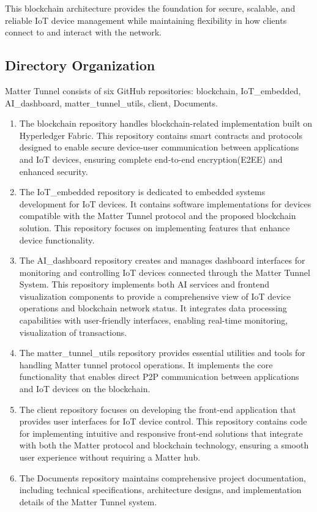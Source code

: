 \documentclass[conference]{IEEEtran}
\begin{document}
This blockchain architecture provides the foundation for secure, scalable, and reliable IoT device management while maintaining flexibility in how clients connect to and interact with the network.


\subsection{Directory Organization}

Matter Tunnel consists of six GitHub repositories: blockchain, IoT\_embedded, AI\_dashboard, matter\_tunnel\_utils, client, Documents.

\begin{enumerate}[itemsep=2ex, parsep=1ex]
	\item The blockchain repository handles blockchain-related implementation built on Hyperledger Fabric. This repository contains smart contracts and protocols designed to enable secure device-user communication between applications and IoT devices, ensuring complete end-to-end encryption(E2EE) and enhanced security.
	      	          
	\item The IoT\_embedded repository is dedicated to embedded systems development for IoT devices. It contains software implementations for devices compatible with the Matter Tunnel protocol and the proposed blockchain solution. This repository focuses on implementing features that enhance device functionality.
	      	          
	\item The AI\_dashboard repository creates and manages dashboard interfaces for monitoring and controlling IoT devices connected through the Matter Tunnel System. This repository implements both AI services and frontend visualization components to provide a comprehensive view of IoT device operations and blockchain network status. It integrates data processing capabilities with user-friendly interfaces, enabling real-time monitoring, visualization of transactions.
	      	          
	\item The matter\_tunnel\_utils repository provides essential utilities and tools for handling Matter tunnel protocol operations. It implements the core functionality that enables direct P2P communication between applications and IoT devices on the blockchain.
	      	          
	\item The client repository focuses on developing the front-end application that provides user interfaces for IoT device control. This repository contains code for implementing intuitive and responsive front-end solutions that integrate with both the Matter protocol and blockchain technology, ensuring a smooth user experience without requiring a Matter hub.
	      	          
	\item The Documents repository maintains comprehensive project documentation, including technical specifications, architecture designs, and implementation details of the Matter Tunnel system.
\end{enumerate}
\end{document}

